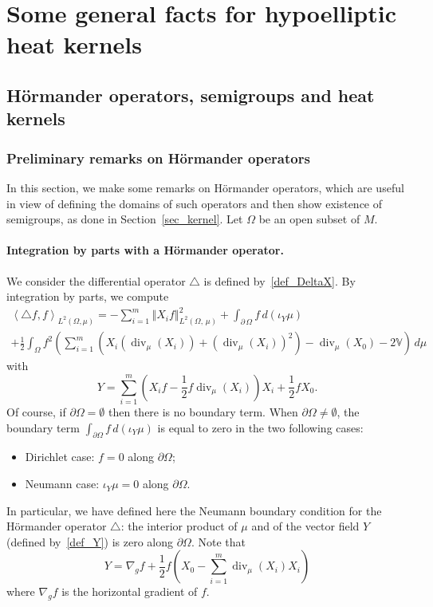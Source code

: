 \documentclass[AHL,Unicode,published]{cedram}
\newcommand{\bbV}{\mathbb{V}}
\DeclareMathOperator{\divl}{div}
\begin{document}
\pagebreak
\section{Some general facts for hypoelliptic heat kernels}\label{sec_facts}
\subsection{H\"ormander operators, semigroups and heat kernels}\label{sec_Hormander_kernel}
\subsubsection{Preliminary remarks on H\"ormander operators}\label{sec_rem_Horm}
In this section, we make some remarks on H\"ormander operators, which are useful in view of defining the domains of such operators and then show existence of semigroups, as done in Section~\ref{sec_kernel}. Let $\Omega$ be an open subset of $M$.

\paragraph{Integration by parts with a H\"ormander operator.}
We consider the differential operator $\triangle$ is defined by~\eqref{def_DeltaX}. By integration by parts, we compute
\begin{multline}\label{IPP_Hormander}
\left\langle \triangle f,f\right\rangle_{L^2(\Omega,\mu)} = - \sum_{i=1}^m\left\Vert X_if\right\Vert_{L^2(\Omega,\,\mu)}^2 + \int_{\partial\,\Omega} f\, d\left(\iota_Y\mu\right) \\
+ \frac{1}{2} \int_\Omega f^2 \left(\sum_{i=1}^m \left(X_i\left(\divl_\mu(X_i)\right) + \left(\divl_\mu(X_i)\right)^2 \right) - \divl_\mu(X_0) - 2\bbV \right) \, d\mu
\end{multline}
with
\begin{equation}\label{def_Y}
Y = \sum_{i=1}^m \left(X_if - \frac{1}{2} f\divl_\mu(X_i) \right) X_i + \frac{1}{2}f X_0.
\end{equation}
Of course, if $\partial\Omega=\emptyset$ then there is no boundary term. When $\partial\Omega\neq\emptyset$, the boundary term $\int_{\partial\Omega} f\, d\left(\iota_Y\mu\right)$ is equal to zero in the two following cases:
\begin{itemize}
\item Dirichlet case: $f=0$ along $\partial\Omega$;
\item Neumann case: $\iota_Y\mu=0$ along $\partial\Omega$.
\end{itemize}
In particular, we have defined here the Neumann boundary condition for the H\"ormander operator $\triangle$: the interior product of $\mu$ and of the vector field $Y$ (defined by~\eqref{def_Y}) is zero along $\partial\Omega$. Note that
\[
Y = \nabla_gf + \frac{1}{2} f \left(X_0 - \sum_{i=1}^m \divl_\mu(X_i) X_i \right)
\]
where $\nabla_gf$ is the horizontal gradient of $f$.
\end{document}
